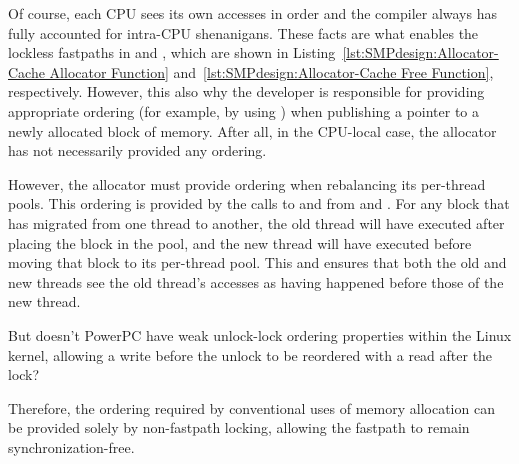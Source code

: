 Of course, each CPU sees its own accesses in order and the compiler
always has fully accounted for intra-CPU shenanigans.
These facts are what enables the lockless fastpaths in
 and , which are shown in
Listing~\ref{lst:SMPdesign:Allocator-Cache Allocator Function}
and~\ref{lst:SMPdesign:Allocator-Cache Free Function},
respectively.
However, this also why the developer is responsible for providing
appropriate ordering (for example, by using )
when publishing a pointer to a newly allocated block of memory.
After all, in the CPU-local case, the allocator has not necessarily
provided any ordering.

However, the allocator must provide ordering when rebalancing its
per-thread pools.
This ordering is provided by the calls to  and
 from  and .
For any block that has migrated from one thread to another, the old
thread will have executed  after
placing the block in the  pool, and the new thread will
have executed  before moving that
block to its per-thread pool.
This  and  ensures that both the
old and new threads see the old thread's accesses as having happened
before those of the new thread.

\QuickQuiz{}
	But doesn't PowerPC have weak unlock-lock ordering properties
	within the Linux kernel, allowing a write before the unlock to
	be reordered with a read after the lock?
 \QuickQuizEnd

Therefore, the ordering required by conventional uses of memory allocation
can be provided solely by non-fastpath locking, allowing the fastpath to
remain synchronization-free.


